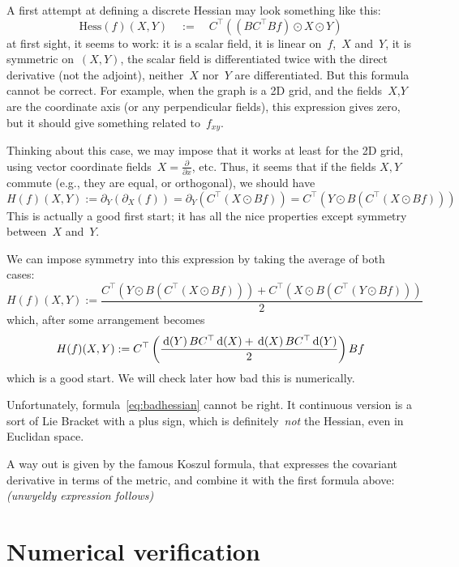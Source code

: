 A first attempt at defining a discrete Hessian may look something like this:
\[
	\mathrm{Hess}\left(f\right)(X,Y)
	\quad
	:=
	\quad
	C^\top\left(\left(BC^\top Bf\right)\odot X\odot Y\right)
\]
at first sight, it seems to work: it is a scalar field, it is linear
on~$f$,~$X$ and~$Y$, it is symmetric on~$(X,Y)$, the scalar field is differentiated twice with the direct
derivative (not the adjoint), neither~$X$ nor~$Y$ are differentiated.
But this formula cannot be correct.  For example, when the graph is a 2D
grid, and the fields~$X$,$Y$ are the coordinate axis (or any perpendicular
fields), this expression gives zero, but it should give something
related to~$f_{xy}$.

Thinking about this case, we may impose that it works at least for the 2D
grid, using vector coordinate fields~$X=\frac{\partial}{\partial x}$, etc.
Thus, it seems that if the fields $X,Y$ commute (e.g., they are equal, or
orthogonal), we should have
\[
	H(f)(X,Y):= \partial_Y(\partial_X(f)) =\partial_Y(C^\top(X\odot Bf))
	=C^\top(Y\odot B(C^\top(X\odot Bf)))
\]
This is actually a good first start; it has all the nice properties except
symmetry between~$X$ and~$Y$.

We can impose symmetry into this expression by taking the average of both
cases:
\begin{equation*}
	H(f)(X,Y):=
	\frac{
		C^\top(Y\odot B(C^\top(X\odot Bf)))
		+
		C^\top(X\odot B(C^\top(Y\odot Bf)))
	}2
\end{equation*}
which, after some arrangement becomes
\begin{equation}\label{eq:badhessian}
	H(f)(X,Y):=
	C^\top\left(
		\frac{
			\,\mathrm{d}\!\left(Y\right)BC^\top\,\mathrm{d}\!\left(X\right)
			+
			\,\mathrm{d}\!\left(X\right)BC^\top\,\mathrm{d}\!\left(Y\right)
		}2
	\right) Bf
\end{equation}
which is a good start.  We will check later how bad this is numerically.

Unfortunately, formula~\eqref{eq:badhessian} cannot be right.  It continuous
version is a sort of Lie Bracket with a plus sign, which is
definitely~\emph{not} the Hessian, even in Euclidan space.

A way out is given by the famous Koszul formula, that expresses the covariant
derivative in terms of the metric, and combine it with the first formula
above: \emph{(unwyeldy expression follows)}

\clearpage
\section{Numerical verification}

